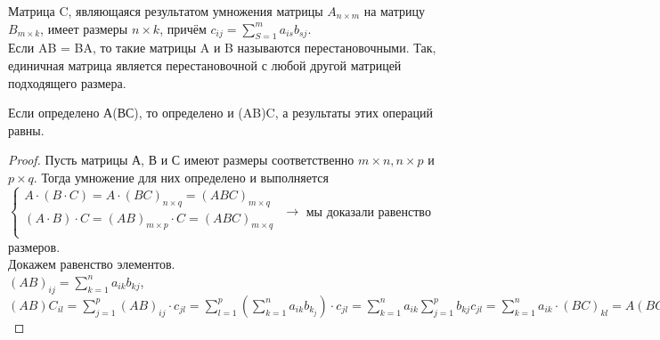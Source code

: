 	Матрица C, являющаяся результатом умножения матрицы $A_{n \times m}$ на матрицу $B_{m \times k}$, имеет размеры $n \times k$, причём $c_{ij} = \sum_{S = 1}^{m} a_{is}b_{sj}$.\\
	
	Если AB = BA, то такие матрицы A и B называются $\textit{перестановочными}$. Так, единичная матрица является перестановочной с любой другой матрицей подходящего размера.
	
	\begin{theorem}
		Если определено А(ВС), то определено и (AB)C, а результаты этих операций равны.
	\end{theorem}
	\begin{proof}
		Пусть матрицы А, В и С имеют размеры соответственно $m \times n, n \times p$ и $p \times q$. Тогда умножение для них определено и выполняется\\
		
		$\begin{cases}
			A \cdot (B \cdot C) = A \cdot (BC)_{n \times q} = (ABC)_{m \times q}\\
			(A \cdot B) \cdot C = (AB)_{m \times p} \cdot C = (ABC)_{m \times q}\\
		\end{cases}$ $\longrightarrow$ мы доказали равенство размеров.\\
		Докажем равенство элементов.\\
		$(AB)_{ij} = \sum_{k = 1}^{n} a_{ik}b_{kj}$, $(AB)C_{il} = \sum_{j = 1}^{p} (AB)_{ij} \cdot c_{jl} = \sum_{l = 1}^{p}(\sum_{k = 1}^{n} a_{ik}b_{k_j}) \cdot c_{jl} = \sum_{k = 1}^{n} a_{ik} \sum_{j = 1}^{p} b_{kj}c_{jl} = \sum_{k = 1}^{n} a_{ik} \cdot (BC)_{kl} = A(BC)_{il}$
	\end{proof}
